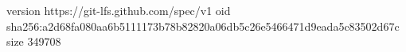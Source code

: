 version https://git-lfs.github.com/spec/v1
oid sha256:a2d68fa080aa6b5111173b78b82820a06db5c26e5466471d9eada5c83502d67c
size 349708
